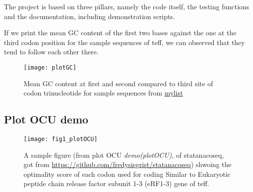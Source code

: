 The project is based on three pillars, namely the code itself, the testing functions and the documentation, including demonstration scripts.


If we print the mean GC content of the first two bases against the one at the third codon position for the sample sequences of teff, we can observed that they tend to follow each other there. 

\begin{figure}[tb] 
\centering 
\texttt{[image: plotGC]} 
\caption[GC percentage at synonymous sites]{Mean GC content at first and second compared to third site of codon trinucleotide for sample sequences from \hyperlink{function:mylist}{mylist}}
\label{fig:plotGC} 
\end{figure} 


\subsection{Plot OCU demo}
\begin{figure}[tb] 
\centering 
\texttt{[image: fig1\_plotOCU]} 
\caption[A sample figure from demo plotOCU]{A sample figure (from plot OCU \emph{demo(plotOCU)}, of statanacoseq, got from \url{https://github.com/fredysiegrist/statanacoseq}) shwoing the optimality score of each codon used for coding Similar to Eukaryotic peptide chain release factor subunit 1-3 (eRF1-3) gene of teff.}
\label{fig:plotOCU} 
\end{figure}
